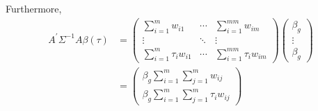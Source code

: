 \documentclass[12pt]{article}
\begin{document}
\begin{appendices}
Furthermore, 
\begin{equation}
\begin{split}
A^{'}\Sigma^{-1}A \beta(\tau) &=   
\begin{pmatrix}
\sum_{i=1}^{m}w_{i1} &  \cdots & \sum_{i=1}^{mm}w_{im} \\
\vdots & \ddots & \vdots \\
\sum_{i=1}^{m} \tau_i w_{i1} &  \cdots & \sum_{i=1}^{mm} \tau_i w_{im}
\end{pmatrix} 
\begin{pmatrix}
\beta_g \\ \vdots \\ \beta_g 
\end{pmatrix} \\ &= 
\begin{pmatrix}
\beta_g \sum_{i=1}^{m} \sum_{j=1}^{m} w_{ij} \\ 
\beta_g \sum_{i=1}^{m} \sum_{j=1}^{m} \tau_i w_{ij} 
\end{pmatrix}
\end{split}
\end{equation}


\end{appendices}
\end{document}
